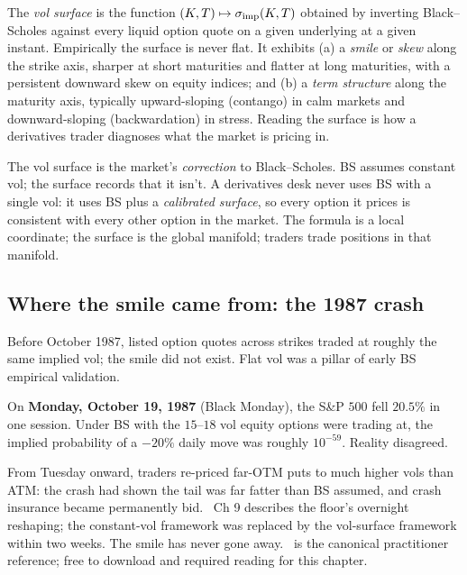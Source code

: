 \begin{keyfactbox}
The \emph{vol surface} is the function $(K, T) \mapsto
\sigma_{\text{imp}}(K, T)$ obtained by inverting
Black--Scholes against every liquid option quote on a given
underlying at a given instant. Empirically the surface is never
flat. It exhibits (a) a \emph{smile} or \emph{skew} along the
strike axis, sharper at short maturities and flatter at long
maturities, with a persistent downward skew on equity indices;
and (b) a \emph{term structure} along the maturity axis, typically
upward-sloping (contango) in calm markets and downward-sloping
(backwardation) in stress. Reading the surface is how a
derivatives trader diagnoses what the market is pricing in.
\end{keyfactbox}

\begin{intuitionbox}
The vol surface is the market's \emph{correction} to Black--Scholes.
BS assumes constant vol; the surface records that it isn't. A
derivatives desk never uses BS with a single vol: it uses BS plus
a \emph{calibrated surface}, so every option it prices is
consistent with every other option in the market. The formula is
a local coordinate; the surface is the global manifold; traders
trade positions in that manifold.
\end{intuitionbox}

\subsection{Where the smile came from: the 1987 crash}
\label{subsec:ch17_smile_origin}

Before October 1987, listed option quotes across strikes traded
at roughly the same implied vol; the smile did not exist. Flat
vol was a pillar of early BS empirical validation.

\begin{historybox}
On \textbf{Monday, October 19, 1987} (Black Monday), the
S\&P $500$ fell $20.5\%$ in one session. Under BS with the
$15$--$18$ vol equity options were trading at, the implied
probability of a $-20\%$ daily move was roughly $10^{-59}$. Reality
disagreed.

From Tuesday onward, traders re-priced far-OTM puts to much
higher vols than ATM: the crash had shown the tail was far fatter
than BS assumed, and crash insurance became permanently bid.
 \citeDerman\ Ch 9 describes the
floor's overnight reshaping; the constant-vol framework was
replaced by the vol-surface framework within two weeks. The smile
has never gone away. 
\citeBennett\ is the canonical practitioner reference; free to
download and required reading for this chapter.
\end{historybox}

